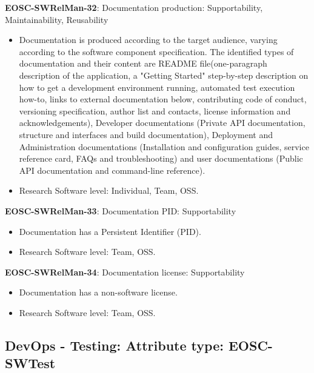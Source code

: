 \textbf{EOSC-SWRelMan-32}: Documentation production: Supportability, Maintainability, Reusability

\begin{itemize}
    \item Documentation is produced according to the target audience, varying according to the software component specification. The identified types of documentation and their content are README file(one-paragraph description of the application, a "Getting Started" step-by-step description on how to get a development environment running, automated test execution how-to, links to external documentation below, contributing code of conduct, versioning specification, author list and contacts, license information and acknowledgements), Developer documentations (Private API documentation, structure and interfaces and build documentation), Deployment and Administration documentations (Installation and configuration guides, service reference card, FAQs and troubleshooting) and user documentations (Public API documentation and command-line reference). \cite{aberdour_achieving_2007,shepherdson_cessda_2019,orviz_set_2017,orviz_fernandez_eosc-synergy_2020,raymond_software_2013}
    \item Research Software level: Individual, Team, OSS.
\end{itemize}

\textbf{EOSC-SWRelMan-33}: Documentation PID: Supportability

\begin{itemize}
    \item Documentation has a Persistent Identifier (PID). \cite{orviz_fernandez_eosc-synergy_2020}
    \item Research Software level: Team, OSS.
\end{itemize}

\textbf{EOSC-SWRelMan-34}: Documentation license: Supportability

\begin{itemize}
    \item Documentation has a non-software license. \cite{orviz_fernandez_eosc-synergy_2020}
    \item Research Software level: Team, OSS.
\end{itemize}

\subsection{DevOps - Testing: Attribute type: EOSC-SWTest}


